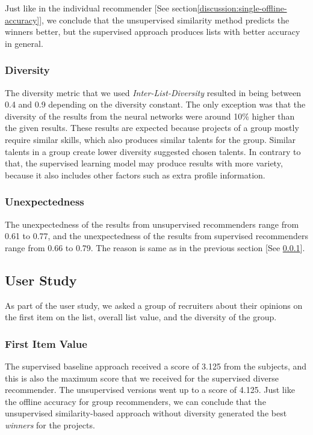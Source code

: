 Just like in the individual recommender [See section\ref{discussion:single-offline-accuracy}], we conclude that the unsupervised similarity method predicts the winners better, but the supervised approach produces lists with better accuracy in general.

\subsubsection{Diversity}\label{discussion:group-offline-diversity}

The diversity metric that we used \textit{Inter-List-Diversity} resulted in being between 0.4 and 0.9 depending on the diversity constant. The only exception was that the diversity of the results from the neural networks were around 10\% higher than the given results. These results are expected because projects of a group mostly require similar skills, which also produces similar talents for the group. Similar talents in a group create lower diversity suggested chosen talents. In contrary to that, the supervised learning model may produce results with more variety, because it also includes other factors such as extra profile information.

\subsubsection{Unexpectedness}

The unexpectedness of the results from unsupervised recommenders range from 0.61 to 0.77, and the unexpectedness of the results from supervised recommenders range from 0.66 to 0.79. The reason is same as in the previous section [See \ref{discussion:group-offline-diversity}].

\subsection{User Study}

As part of the user study, we asked a group of recruiters about their opinions on the first item on the list, overall list value, and the diversity of the group.

\subsubsection{First Item Value}

The supervised baseline approach received a score of 3.125 from the subjects, and this is also the maximum score that we received for the supervised diverse recommender. The unsupervised versions went up to a score of 4.125. Just like the offline accuracy for group recommenders, we can conclude that the unsupervised similarity-based approach without diversity generated the best \textit{winners} for the projects.


